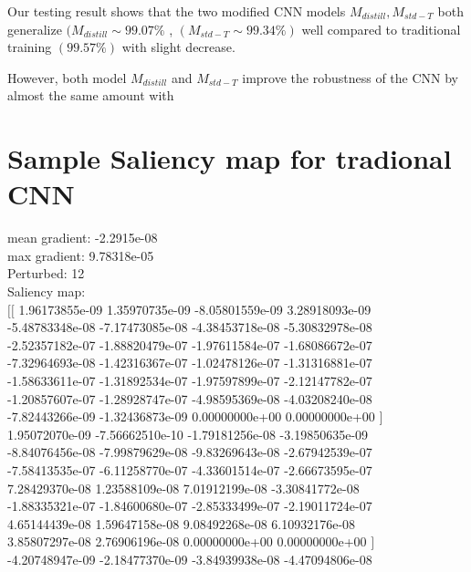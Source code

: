 \documentclass{article}
\begin{document}
Our testing result shows that the two modified CNN models $M_{distill},M_{std-T}$ both generalize $(M_{distill} \sim 99.07\%$ , $(M_{std-T} \sim 99.34\%)$ well compared to traditional training $(99.57\%)$ with slight decrease. 

However, both model $M_{distill}$ and $M_{std-T}$ improve the robustness of the CNN by almost the same amount with 




\newpage
\appendix
\section{Sample Saliency map for tradional CNN}
mean gradient: -2.2915e-08\\
max gradient: 9.78318e-05\\
Perturbed: 12\\
Saliency map:\\
$[[$  1.96173855e-09   1.35970735e-09  -8.05801559e-09   3.28918093e-09 \\
   -5.48783348e-08  -7.17473085e-08  -4.38453718e-08  -5.30832978e-08 \\
   -2.52357182e-07  -1.88820479e-07  -1.97611584e-07  -1.68086672e-07 \\
   -7.32964693e-08  -1.42316367e-07  -1.02478126e-07  -1.31316881e-07 \\
   -1.58633611e-07  -1.31892534e-07  -1.97597899e-07  -2.12147782e-07 \\
   -1.20857607e-07  -1.28928747e-07  -4.98595369e-08  -4.03208240e-08 \\
   -7.82443266e-09  -1.32436873e-09   0.00000000e+00   0.00000000e+00 $]$ \\
    1.95072070e-09  -7.56662510e-10  -1.79181256e-08  -3.19850635e-09 \\
   -8.84076456e-08  -7.99879629e-08  -9.83269643e-08  -2.67942539e-07 \\
   -7.58413535e-07  -6.11258770e-07  -4.33601514e-07  -2.66673595e-07 \\
    7.28429370e-08   1.23588109e-08   7.01912199e-08  -3.30841772e-08 \\
   -1.88335321e-07  -1.84600680e-07  -2.85333499e-07  -2.19011724e-07 \\
    4.65144439e-08   1.59647158e-08   9.08492268e-08   6.10932176e-08 \\
	3.85807297e-08   2.76906196e-08   0.00000000e+00   0.00000000e+00 $]$ \\
   -4.20748947e-09  -2.18477370e-09  -3.84939938e-08  -4.47094806e-08 \\
\end{document}
